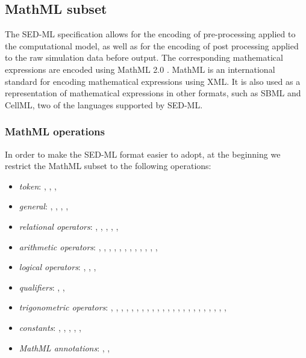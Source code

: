\subsection{MathML subset}
\label{sec:mathML}
The SED-ML specification allows for the encoding of pre-processing applied to the computational model,  as well as for the encoding of post processing applied to the raw simulation data before output. 
The corresponding mathematical expressions are encoded using MathML 2.0 \citep{CIM+01}. MathML is an international standard for encoding mathematical expressions using XML. It is also used as a representation of mathematical expressions in other formats, such as SBML and CellML, two of the languages supported by SED-ML. 

\subsubsection{MathML operations}
In order to make the SED-ML format easier to adopt, at the beginning we restrict the MathML subset to the following operations: 

\begin{itemize}\setlength{\parskip}{-0.1ex}

\item \emph{token}: , , ,
  
\item \emph{general}: , ,
  , ,  

\item \emph{relational operators}: , ,
  , , , 

\item \emph{arithmetic operators}: , ,
  , , , ,
  , , , ,
  , , 

\item \emph{logical operators}: , ,
  , 

\item \emph{qualifiers}: , ,

\item \emph{trigonometric operators}: , ,
  , , , ,
  , , , ,
  , , , ,
  , , , ,
  , , ,
  , , 

\item \emph{constants}: , ,
  , , ,

\item \emph{MathML annotations}: ,
  , 
\end{itemize}


